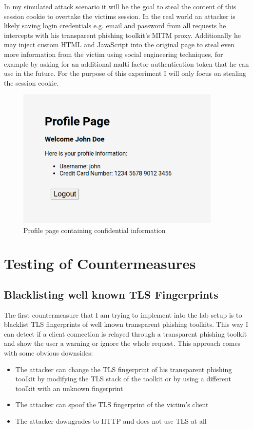 \documentclass[12pt]{scrbook}
\begin{document}
In my simulated attack scenario it will be the goal to steal the content of
this session cookie to overtake the victims session. In the real world an
attacker is likely saving login credentials e.g. email and password from all
requests he intercepts with his transparent phishing toolkit's MITM proxy.
Additionally he may inject custom HTML and JavaScript into the original page to
steal even more information from the victim using social engineering techniques,
for example by asking for an additional multi factor authentication token that
he can use in the future. For the purpose of this experiment I will only focus
on stealing the session cookie.

\begin{figure}[!htb] \centering
	\includegraphics[height=7cm]{./images/profile_page.png} \caption{Profile page
		containing confidential information} \end{figure}

\newpage \section{Testing of Countermeasures} \subsection{Blacklisting well
	known TLS Fingerprints} The first countermeasure that I am trying to
implement into the lab setup is to blacklist TLS fingerprints of well known
transparent phishing toolkits. This way I can detect if a client connection is
relayed through a transparent phishing toolkit and show the user a warning or
ignore the whole request. This approach comes with some obvious downsides:

\begin{itemize}
	\item The attacker can change the TLS fingerprint of his
	      transparent phishing toolkit by modifying the TLS stack of the toolkit or
	      by
	      using a different toolkit with an unknown fingerprint
	\item The attacker can spoof the TLS fingerprint of the victim's client
	\item The attacker downgrades to HTTP and does not use TLS at all
\end{itemize}
\end{document}

